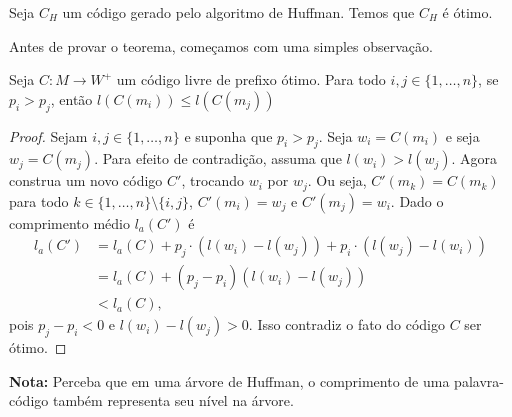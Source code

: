 \begin{theorem}
  \label{thm:otimo_huffman}
  Seja $C_{H}$ um código gerado pelo algoritmo de Huffman. Temos que
  $C_{H}$ é ótimo.
\end{theorem}

Antes de provar o teorema, começamos com uma simples observação.
  
\begin{lemma} \label{lemma:dist_prob_avg_size} Seja $C:M\to W^+$ um código livre de prefixo ótimo. Para todo $i,j \in\{1,\dotsc, n\}$, se $p_i > p_j$, então $l(C(m_i)) \leq l(C(m_j))$
\end{lemma}
  \begin{proof}
    Sejam $i,j \in\{1,\dotsc, n\}$ e suponha que $p_i > p_j$.  Seja
    $w_i = C(m_i)$ e seja $w_j = C(m_j)$. Para efeito de contradição,
    assuma que $l(w_i) > l(w_j)$.  Agora construa um novo código $C'$,
    trocando $w_i$ por $w_j$. Ou seja, $C'(m_k) = C(m_k)$ para todo $k
    \in \{1,\dotsc, n\} \setminus \{i,j\}$, $C'(m_i) = w_j$ e $C'(m_j)
    = w_i$.  Dado o comprimento médio $l_a(C')$ é
 \begin{align*}
   l_a(C') &= l_a(C) + p_j\cdot(l(w_i) - l(w_j)) + p_i\cdot(l(w_j) - l(w_i)) \\
   &= l_a(C) + (p_j - p_i)(l(w_i) - l(w_j))\\
   &< l_a(C),
 \end{align*}
 pois $p_j - p_i < 0$ e $l(w_i) - l(w_j)>0$. Isso contradiz o fato do
 código $C$ ser ótimo.
  \end{proof}

\noindent \textbf{Nota:} Perceba que em uma árvore de Huffman, o comprimento de uma palavra-código também representa seu nível na árvore.

